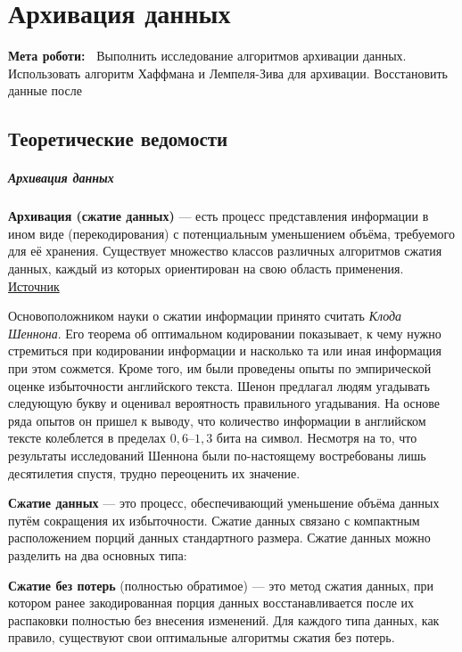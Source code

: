 \chapter{Архивация данных} \label{chapt8}%
\textbf{Мета роботи:~}%
Выполнить исследование алгоритмов архивации данных. Использовать алгоритм
Хаффмана и Лемпеля-Зива для архивации. Восстановить данные после
\section{Теоретические ведомости} \label{sect8_a}
\paragraph{Архивация данных}

\textbf{Архивация (сжатие данных)} --- есть процесс представления информации
в ином виде (перекодирования) с потенциальным уменьшением объёма, требуемого
для её хранения. Существует множество классов различных алгоритмов сжатия
данных, каждый из которых ориентирован на свою область применения.
\href{http://studopedia.ru/9_131056_simmetrichnie-kriptosistemi.html}{Источник}

Основоположником науки о сжатии информации принято считать \emph{Клода
Шеннона}. Его теорема об оптимальном кодировании показывает, к чему нужно
стремиться при кодировании информации и насколько та или иная информация при
этом сожмется. Кроме того, им были проведены опыты по эмпирической оценке
избыточности английского текста. Шенон предлагал людям угадывать следующую
букву и оценивал вероятность правильного угадывания. На основе ряда опытов он
пришел к выводу, что количество информации в английском тексте колеблется в
пределах $0,6 – 1,3$ бита на символ. Несмотря на то, что результаты
исследований Шеннона были по-настоящему востребованы лишь десятилетия спустя,
трудно переоценить их значение.

\textbf{Сжатие данных} --- это процесс, обеспечивающий уменьшение объёма
данных путём сокращения их избыточности. Сжатие данных связано с компактным
расположением порций данных стандартного размера. Сжатие данных можно
разделить на два основных типа:


\textbf{Сжатие без потерь} (полностью обратимое) --- это метод сжатия данных,
при котором ранее закодированная порция данных восстанавливается после их
распаковки полностью без внесения изменений. Для каждого типа данных, как
правило, существуют свои оптимальные алгоритмы сжатия без потерь.

